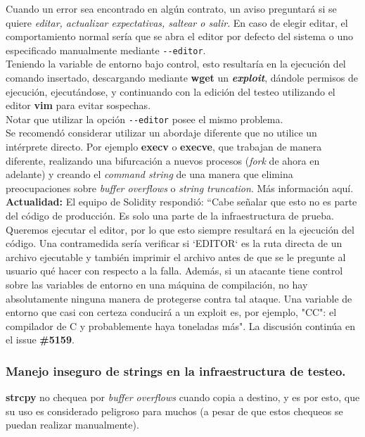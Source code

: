 Cuando un error sea encontrado en algún contrato, un aviso preguntará si se quiere \textit{editar, actualizar expectativas, saltear o salir}. En caso de elegir editar, el comportamiento normal sería que se abra el editor por defecto del sistema o uno especificado manualmente mediante \verb|--editor|.\\

Teniendo la variable de entorno bajo control, esto resultaría en la ejecución del comando insertado, descargando mediante \textbf{wget} un \textit{\textbf{exploit}}, dándole permisos de ejecución, ejecutándose, y continuando con la edición del testeo utilizando el editor \textbf{vim} para evitar sospechas.\\

Notar que utilizar la opción \verb|--editor| posee el mismo problema.\\

Se recomendó considerar utilizar un abordaje diferente que no utilice un intérprete directo. Por ejemplo \textbf{execv} o \textbf{execve}, que trabajan de manera diferente, realizando una bifurcación a nuevos procesos (\textit{fork} de ahora en adelante) y creando el \textit{command string} de una manera que elimina preocupaciones sobre \textit{buffer overflows} o \textit{string truncation}. Más información aquí\cite{CMUSystem}.\\

\textbf{Actualidad:} El equipo de Solidity respondió: “Cabe señalar que esto no es parte del código de producción. Es solo una parte de la infraestructura de prueba. Queremos ejecutar el editor, por lo que esto siempre resultará en la ejecución del código. Una contramedida sería verificar si `EDITOR` es la ruta directa de un archivo ejecutable y también imprimir el archivo antes de que se le pregunte al usuario qué hacer con respecto a la falla. Además, si un atacante tiene control sobre las variables de entorno en una máquina de compilación, no hay absolutamente ninguna manera de protegerse contra tal ataque. Una variable de entorno que casi con certeza conducirá a un exploit es, por ejemplo, "CC": el compilador de C y probablemente haya toneladas más". La discusión continúa en el issue \textbf{\#5159}\cite{GHI5159}.

\subsubsection{Manejo inseguro de strings en la infraestructura de testeo.}
\textbf{strcpy} no chequea por \textit{buffer overflows} cuando copia a destino, y es por esto, que su uso es considerado peligroso para muchos\cite{MSSDLBanned} (a pesar de que estos chequeos se puedan realizar manualmente).

